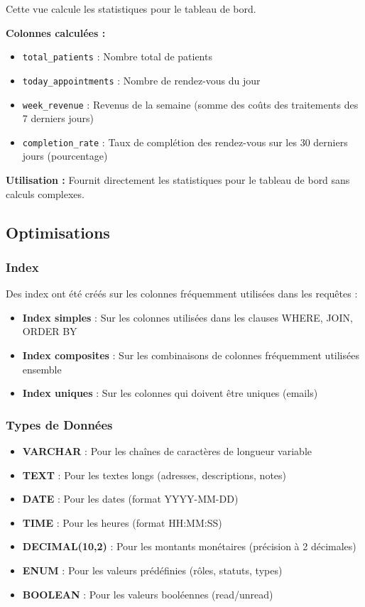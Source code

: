 \documentclass[12pt,a4paper]{report}
\begin{document}
Cette vue calcule les statistiques pour le tableau de bord.

\textbf{Colonnes calculées :}
\begin{itemize}
    \item \texttt{total\_patients} : Nombre total de patients
    \item \texttt{today\_appointments} : Nombre de rendez-vous du jour
    \item \texttt{week\_revenue} : Revenus de la semaine (somme des coûts des traitements des 7 derniers jours)
    \item \texttt{completion\_rate} : Taux de complétion des rendez-vous sur les 30 derniers jours (pourcentage)
\end{itemize}

\textbf{Utilisation :} Fournit directement les statistiques pour le tableau de bord sans calculs complexes.

\subsection{Optimisations}

\subsubsection{Index}

Des index ont été créés sur les colonnes fréquemment utilisées dans les requêtes :

\begin{itemize}
    \item \textbf{Index simples} : Sur les colonnes utilisées dans les clauses WHERE, JOIN, ORDER BY
    \item \textbf{Index composites} : Sur les combinaisons de colonnes fréquemment utilisées ensemble
    \item \textbf{Index uniques} : Sur les colonnes qui doivent être uniques (emails)
\end{itemize}

\subsubsection{Types de Données}

\begin{itemize}
    \item \textbf{VARCHAR} : Pour les chaînes de caractères de longueur variable
    \item \textbf{TEXT} : Pour les textes longs (adresses, descriptions, notes)
    \item \textbf{DATE} : Pour les dates (format YYYY-MM-DD)
    \item \textbf{TIME} : Pour les heures (format HH:MM:SS)
    \item \textbf{DECIMAL(10,2)} : Pour les montants monétaires (précision à 2 décimales)
    \item \textbf{ENUM} : Pour les valeurs prédéfinies (rôles, statuts, types)
    \item \textbf{BOOLEAN} : Pour les valeurs booléennes (read/unread)
\end{itemize}
\end{document}
